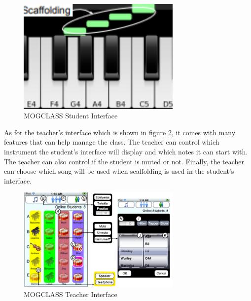 \begin{figure}[H]
    \centering
    \includegraphics[width=8cm ]{mogclass_studen_interfaces.PNG}
    \caption{MOGCLASS Student Interface \protect\cite{zhou2011mogclass}}
    \label{fig:mogclass_student_interface}
\end{figure}

As for the teacher’s interface which is shown in figure \ref{fig:mogclass_teacher_interface}, it comes with many features that can help manage the class. The teacher can control which instrument the student’s interface will display and which notes it can start with. The teacher can also control if the student is muted or not. Finally, the teacher can choose which song will be used when scaffolding is used in the student’s interface.

\begin{figure}[H]
    \centering
    \includegraphics[width=8cm ]{mogclass_teacher_interace.PNG}
    \caption{MOGCLASS Teacher Interface \protect\cite{zhou2011mogclass}}
    \label{fig:mogclass_teacher_interface}
\end{figure}


